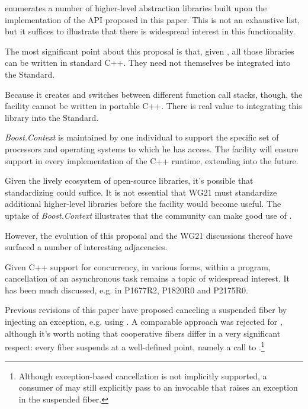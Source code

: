 

 enumerates a number of higher-level abstraction libraries
built upon the \bcontext\xspace implementation of the API proposed in this paper.
This is not an exhaustive list, but it suffices to illustrate that there is
widespread interest in this functionality.

The most significant point about this proposal is that, given \fiber, all
those libraries can be written in standard C++. They need not themselves be
integrated into the Standard.

Because it creates and switches between different function call stacks,
though, the \fiber facility cannot be written in portable C++. There is real
value to integrating this library into the Standard.

\emph{Boost.Context} is maintained by one individual to support the specific
set of processors and operating systems to which he has access. The \fiber
facility will ensure support in every implementation of the C++ runtime,
extending into the future.

Given the lively ecosystem of open-source libraries, it's possible that
standardizing \fiber could suffice. It is not essential that
WG21 must standardize additional higher-level libraries before the facility
would become useful. The uptake of \emph{Boost.Context} illustrates that the
community can make good use of \fiber.

However, the evolution of this proposal and the WG21 discussions thereof have
surfaced a number of interesting adjacencies.


Given C++ support for concurrency, in various forms, within a program,
cancellation of an asynchronous task remains a topic of widespread interest.
It has been much discussed, e.g. in P1677R2\cite{P1677R2},
P1820R0\cite{P1820R0} and P2175R0\cite{P2175R0}.

Previous revisions of this paper have proposed canceling a suspended fiber by
injecting an exception, e.g. using \fiber\cpp{::}\resumewith. A comparable
approach was rejected for , although it's worth noting that
cooperative fibers differ in a very significant respect: every fiber suspends
at a well-defined point, namely a call to \resumewith.\footnote{Although
exception-based cancellation is not implicitly supported, a consumer of \fiber
may still explicitly pass to \resumewith an invocable that raises an exception
in the suspended fiber.}

